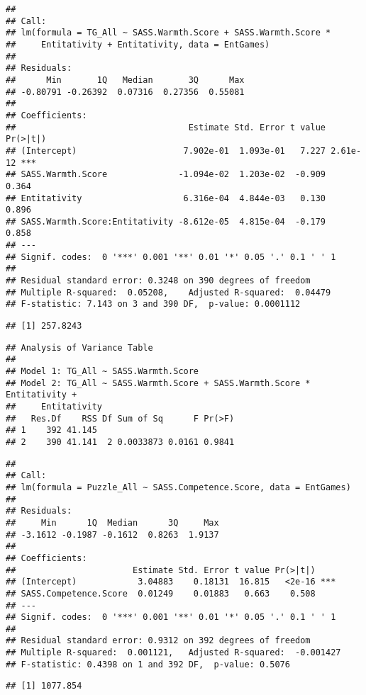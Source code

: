 \documentclass[
  doc,draftall]{apa6}
\begin{document}
\begin{verbatim}
## 
## Call:
## lm(formula = TG_All ~ SASS.Warmth.Score + SASS.Warmth.Score * 
##     Entitativity + Entitativity, data = EntGames)
## 
## Residuals:
##      Min       1Q   Median       3Q      Max 
## -0.80791 -0.26392  0.07316  0.27356  0.55081 
## 
## Coefficients:
##                                  Estimate Std. Error t value Pr(>|t|)    
## (Intercept)                     7.902e-01  1.093e-01   7.227 2.61e-12 ***
## SASS.Warmth.Score              -1.094e-02  1.203e-02  -0.909    0.364    
## Entitativity                    6.316e-04  4.844e-03   0.130    0.896    
## SASS.Warmth.Score:Entitativity -8.612e-05  4.815e-04  -0.179    0.858    
## ---
## Signif. codes:  0 '***' 0.001 '**' 0.01 '*' 0.05 '.' 0.1 ' ' 1
## 
## Residual standard error: 0.3248 on 390 degrees of freedom
## Multiple R-squared:  0.05208,    Adjusted R-squared:  0.04479 
## F-statistic: 7.143 on 3 and 390 DF,  p-value: 0.0001112
\end{verbatim}

\begin{verbatim}
## [1] 257.8243
\end{verbatim}

\begin{verbatim}
## Analysis of Variance Table
## 
## Model 1: TG_All ~ SASS.Warmth.Score
## Model 2: TG_All ~ SASS.Warmth.Score + SASS.Warmth.Score * Entitativity + 
##     Entitativity
##   Res.Df    RSS Df Sum of Sq      F Pr(>F)
## 1    392 41.145                           
## 2    390 41.141  2 0.0033873 0.0161 0.9841
\end{verbatim}

\begin{verbatim}
## 
## Call:
## lm(formula = Puzzle_All ~ SASS.Competence.Score, data = EntGames)
## 
## Residuals:
##     Min      1Q  Median      3Q     Max 
## -3.1612 -0.1987 -0.1612  0.8263  1.9137 
## 
## Coefficients:
##                       Estimate Std. Error t value Pr(>|t|)    
## (Intercept)            3.04883    0.18131  16.815   <2e-16 ***
## SASS.Competence.Score  0.01249    0.01883   0.663    0.508    
## ---
## Signif. codes:  0 '***' 0.001 '**' 0.01 '*' 0.05 '.' 0.1 ' ' 1
## 
## Residual standard error: 0.9312 on 392 degrees of freedom
## Multiple R-squared:  0.001121,   Adjusted R-squared:  -0.001427 
## F-statistic: 0.4398 on 1 and 392 DF,  p-value: 0.5076
\end{verbatim}

\begin{verbatim}
## [1] 1077.854
\end{verbatim}
\end{document}
